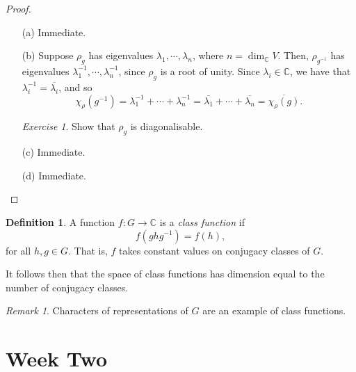 \documentclass[a4paper]{report}
\theoremstyle{definition}
\newtheorem{definition}{Definition}
\theoremstyle{remark}
\newtheorem{remark}{Remark}
\theoremstyle{proposition}
\theoremstyle{conjecture}
\theoremstyle{lemma}
\theoremstyle{corollary}
\theoremstyle{exercise}
\newtheorem{exercise}{Exercise}
\theoremstyle{example}
\newcommand{\C}{\mathbb{C}}
\begin{document}
\begin{proof}
    \leavevmode
    \begin{itemize}
        \item[(a)] Immediate.
        \item[(b)] Suppose $\rho_g$ has eigenvalues $\lambda_1,\cdots,\lambda_n$, where $n = \dim_\C V$. Then, $\rho_{g^{-1}}$ has eigenvalues 
            $\lambda_1^{-1},\cdots,\lambda_n^{-1}$, since 
            $\rho_g$ is a root of unity. Since $\lambda_i \in \C$,
            we have that $\lambda_i^{-1} = \overline{\lambda_i}$,
            and so $$\chi_\rho(g^{-1}) = \lambda_1^{-1} + \cdots + \lambda_n^{-1} = \overline{\lambda_1} + \cdots + \overline{\lambda_n} = \overline{\chi_\rho(g)}.$$
            \begin{exercise}
                Show that $\rho_g$ is diagonalisable.
            \end{exercise}
        \item[(c)] Immediate.
        \item[(d)] Immediate.
    \end{itemize}
\end{proof}

\begin{definition}
    A function $f : G \to \C$ is a \emph{class function} if 
    $$f(ghg^{-1}) = f(h),$$
    for all $h,g\in G$. That is, $f$ takes constant values on conjugacy classes
    of $G$.
\end{definition}

It follows then that the space of class functions has dimension equal to the 
number of conjugacy classes.

\begin{remark}
    Characters of representations of $G$ are an example of class functions.
\end{remark}

%
%


\chapter{Week Two}
\end{document}
